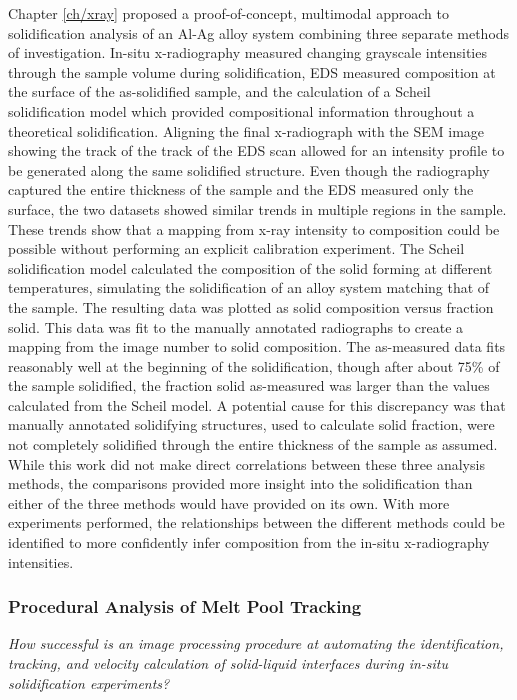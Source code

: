 Chapter \ref{ch/xray} proposed a proof-of-concept, multimodal approach
to solidification analysis of an Al-Ag alloy system combining three
separate methods of investigation.
In-situ x-radiography measured changing grayscale intensities
through the sample volume during solidification,
EDS measured composition at the surface of the as-solidified
sample, and the calculation of a Scheil solidification model
which provided compositional information throughout a theoretical
solidification.
Aligning the final x-radiograph with the SEM image
showing the track of the track of the EDS scan allowed for an intensity
profile to be generated along the same solidified structure. Even though
the radiography captured the entire thickness of the sample and the
EDS measured only the surface, the two datasets showed similar trends
in multiple regions in the sample. These trends show that a mapping
from x-ray intensity to composition could be possible without performing
an explicit calibration experiment.
The Scheil solidification model calculated the composition of the solid
forming at different temperatures, simulating the solidification of an
alloy system matching that of the sample. The resulting data was plotted
as solid composition versus fraction solid. This data was fit to the
manually annotated radiographs to create a mapping from the image number
to solid composition. The as-measured data fits reasonably well at the
beginning of the solidification, though after about 75\% of the sample
solidified, the fraction solid as-measured was larger than the values
calculated from the Scheil model. A potential cause for this discrepancy
was that manually annotated solidifying structures, used to calculate
solid fraction, were not completely solidified through the entire
thickness of the sample as assumed.
While this work did not make direct correlations between these three
analysis methods, the comparisons provided more insight into the
solidification than either of the three methods would have provided on
its own.
With more experiments performed, the relationships between the different
methods could be identified to more confidently infer composition from
the in-situ x-radiography intensities.

\subsubsection{Procedural Analysis of Melt Pool Tracking}
\noindent \textit{
    How successful is an image processing procedure at automating the
    identification, tracking, and velocity calculation of solid-liquid interfaces
    during in-situ solidification experiments?
}

